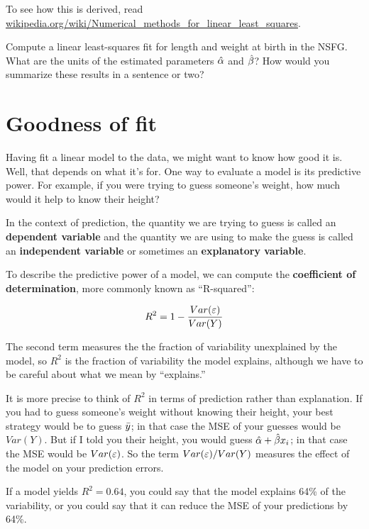 \documentclass[12pt]{book}
\begin{document}
To see how this is derived, read
\url{wikipedia.org/wiki/Numerical_methods_for_linear_least_squares}.

\begin{ex}

Compute a linear least-squares fit for length and weight at birth
in the NSFG.  What are the units of the estimated parameters
$\hat{\alpha}$ and $\hat{\beta}$?  How would you summarize these results
in a sentence or two?

\end{ex}


\section{Goodness of fit}

Having fit a linear model to the data, we might want to know how good
it is.  Well, that depends on what it's for.  One way to evaluate a model
is its predictive power.  For example, if you were trying to guess
someone's weight, how much would it help to know their height?

In the context of prediction, the quantity we are trying to guess is
called an {\bf dependent variable} and the quantity we are using
to make the guess is called an {\bf independent variable} or sometimes
an {\bf explanatory variable}.

To describe the predictive power of a model, we can compute the {\bf
  coefficient of determination}, more commonly known as ``R-squared'':

\[ R^2 = 1 - \frac{Var(\varepsilon)}{Var(Y)}\]

The second term measures the the fraction of variability unexplained
by the model, so $R^2$ is the fraction of variability the model
explains, although we have to be careful about what we mean by
``explains.''

It is more precise to think of $R^2$ in terms of prediction rather
than explanation.  If you had to guess someone's weight without
knowing their height, your best strategy would be to guess $\bar{y}$; in
that case the MSE of your guesses would be $Var(Y)$.  But if I told
you their height, you would guess $\hat{\alpha} + \hat{\beta} x_i$;
in that case the MSE would be $Var(\varepsilon)$.  So the term
$Var(\varepsilon)/Var(Y)$ measures the effect of the model on your prediction
errors.

If a model yields $R^2 = 0.64$, you could say that the model explains
64\% of the variability, or you could say that it can reduce the MSE
of your predictions by 64\%.
\end{document}

